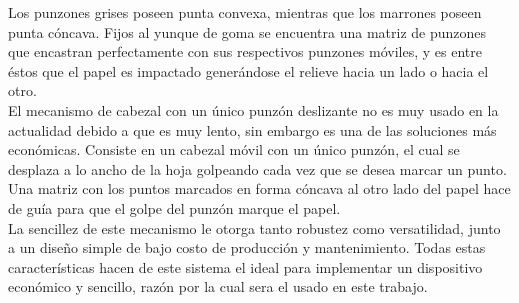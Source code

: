 Los punzones grises poseen punta convexa, mientras que los marrones poseen
punta c\'oncava. Fijos al yunque de goma se encuentra una matriz de punzones
que encastran perfectamente con sus respectivos punzones m\'oviles, y es entre
\'estos que el papel es impactado gener\'andose el relieve hacia un lado o
hacia el otro. \\

El mecanismo de cabezal con un \'unico punz\'on deslizante no es muy usado
en la actualidad debido a que es muy lento, sin embargo es una de las
soluciones m\'as econ\'omicas. Consiste en un cabezal m\'ovil con un \'unico
punz\'on, el cual se desplaza a lo ancho de la hoja golpeando cada vez que se
desea marcar un punto. Una matriz con los puntos marcados en forma c\'oncava al
otro lado del papel hace de gu\'ia para que el golpe del punz\'on marque el
papel.\\


%
%

La sencillez de este mecanismo le otorga tanto robustez como versatilidad,
junto a un dise\~no simple de bajo costo de producci\'on y mantenimiento. Todas
estas caracter\'isticas hacen de este sistema el ideal para implementar un
dispositivo econ\'omico y sencillo, raz\'on por la cual sera el usado en
este trabajo.